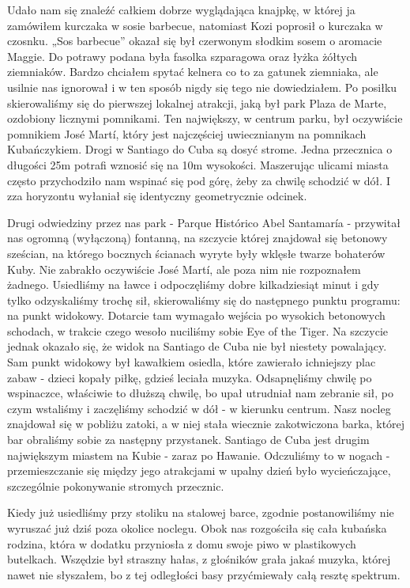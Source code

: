 Udało nam się znaleźć całkiem dobrze wyglądająca knajpkę, w której ja zamówiłem kurczaka w sosie barbecue, natomiast Kozi poprosił o kurczaka w czosnku.
„Sos barbecue” okazał się był czerwonym słodkim sosem o aromacie Maggie.
Do potrawy podana była fasolka szparagowa oraz łyżka żółtych ziemniaków.
Bardzo chciałem spytać kelnera co to za gatunek ziemniaka, ale usilnie nas ignorował i w ten sposób nigdy się tego nie dowiedziałem.
Po posiłku skierowaliśmy się do pierwszej lokalnej atrakcji, jaką był park Plaza de Marte, ozdobiony licznymi pomnikami.
Ten największy, w centrum parku, był oczywiście pomnikiem José Martí, który jest najczęściej uwiecznianym na pomnikach Kubańczykiem.
Drogi w Santiago do Cuba są dosyć strome.
Jedna przecznica o długości 25m potrafi wznosić się na 10m wysokości. Maszerując ulicami miasta często przychodziło nam wspinać się pod górę, żeby za chwilę schodzić w dół. I zza horyzontu wyłaniał się identyczny geometrycznie odcinek.
\par Drugi odwiedziny przez nas park - Parque Histórico Abel Santamaría - przywitał nas ogromną (wyłączoną) fontanną, na szczycie której znajdował się betonowy sześcian, na którego bocznych ścianach wyryte były wklęsłe twarze bohaterów Kuby. Nie zabrakło oczywiście José Martí, ale poza nim nie rozpoznałem żadnego.
Usiedliśmy na ławce i odpoczęliśmy dobre kilkadziesiąt minut i gdy tylko odzyskaliśmy trochę sił, skierowaliśmy się do następnego punktu programu: na punkt widokowy.
Dotarcie tam wymagało wejścia po wysokich betonowych schodach, w trakcie czego wesoło nuciliśmy sobie Eye of the Tiger.
Na szczycie jednak okazało się, że widok na Santiago de Cuba nie był niestety powalający.
Sam punkt widokowy był kawałkiem osiedla, które zawierało ichniejszy plac zabaw - dzieci kopały piłkę, gdzieś leciała muzyka.
Odsapnęliśmy chwilę po wspinaczce, właściwie to dłuższą chwilę, bo upał utrudniał nam zebranie sił, po czym wstaliśmy i zaczęliśmy schodzić w dół - w kierunku centrum.
Nasz nocleg znajdował się w pobliżu zatoki, a w niej stała wiecznie zakotwiczona barka, której bar obraliśmy sobie za następny przystanek.
Santiago de Cuba jest drugim największym miastem na Kubie - zaraz po Hawanie. Odczuliśmy to w nogach - przemieszczanie się między jego atrakcjami w upalny dzień było wycieńczające, szczególnie pokonywanie stromych przecznic.
\par Kiedy już usiedliśmy przy stoliku na stalowej barce, zgodnie postanowiliśmy nie wyruszać już dziś poza okolice noclegu.
Obok nas rozgościła się cała kubańska rodzina, która w dodatku przyniosła z domu swoje piwo w plastikowych butelkach. Wszędzie był straszny hałas, z głośników grała jakaś muzyka, której nawet nie słyszałem, bo z tej odległości basy przyćmiewały całą resztę spektrum.
